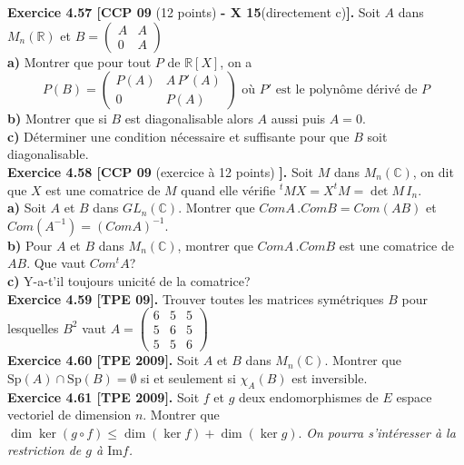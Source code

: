 \documentclass[a4paper,12pt,francais]{article}
\newcommand{\field}[1]{\mathbb{#1}}
\newcommand{\R}{\field{R}}
\newcommand{\C}{\field{C}}
\newcommand{\im}{\mbox{Im}}
\begin{document}
\noindent
{\bf Exercice 4.57 [CCP 09} (12 points) {\bf - X 15}(directement c){\bf ].}
Soit $A$ dans $M_n(\R)$ et $B=\left( \begin{array}{cc} A&A\\ 0&A \end{array} \right)$\\
{\bf a)} Montrer que pour tout $P$ de $\R[X]$, on a 
$$P(B)=\left( \begin{array}{cc} P(A)& A\, P'(A)\\ 0&P(A) \end{array} \right) \mbox{ où $P'$ est le polynôme dérivé de } P$$
{\bf b)} Montrer que si $B$ est diagonalisable alors $A$ aussi puis $A=0$.\\
{\bf c)} Déterminer une condition nécessaire et suffisante pour que $B$ soit diagonalisable.\\

\noindent
{\bf Exercice 4.58 [CCP 09} (exercice à 12 points) {\bf ].}
Soit $M$ dans $M_n(\C)$, on dit que $X$ est une comatrice de $M$ quand elle vérifie $^tMX=X^tM=\det M \, I_n$.\\
{\bf a)} Soit $A$ et $B$ dans $GL_n(\C)$. Montrer que $Com A \,. Com B = Com (AB)$ et $Com (A^{-1})= (Com A)^{-1}$.\\
{\bf b)} Pour $A$ et $B$ dans $M_n(\C)$, montrer que $Com A \,. Com B$ est une comatrice de $AB$. Que vaut $Com ^t A$?\\
{\bf c)} Y-a-t'il toujours unicité de la comatrice?\\

\noindent
{\bf Exercice 4.59 [TPE 09]. }
 Trouver toutes les matrices symétriques $B$ pour lesquelles $B^2$ vaut
$A=\left( \begin{array}{ccc}
6&5&5\\
5&6&5\\
5&5&6
\end{array} \right)$\\

\noindent
{\bf Exercice 4.60 [TPE 2009].} Soit $A$ et $B$ dans $M_n(\C)$. Montrer que $\mbox{Sp}(A) \cap \mbox{Sp}(B)=\emptyset$ si et seulement si $\chi_A(B) $ est inversible.\\

\noindent
{\bf Exercice 4.61 [TPE 2009].} Soit $f$ et $g$ deux endomorphismes de $E$ espace vectoriel de dimension $n$. Montrer que $\dim \ker (g\circ f) \leqslant \dim(\ker f) + \dim(\ker g)$. {\it On pourra s'intéresser à la restriction de $g$ à $\im f$.}\\
\end{document}
